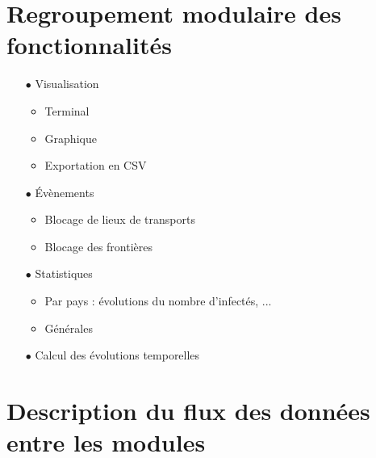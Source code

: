 \documentclass[12pt,a4paper]{report}
\begin{document}
\section*{Regroupement modulaire des fonctionnalités}
\begin{flushleft}
	\begin{itemize}
		\item[$\bullet$] Visualisation
			\begin{itemize}
				\item Terminal
				\item Graphique
				\item Exportation en CSV
			\end{itemize}
		\item[$\bullet$] Évènements
			\begin{itemize}
				\item Blocage de lieux de transports
				\item Blocage des frontières
			\end{itemize}
		\item[$\bullet$] Statistiques
			\begin{itemize}
				\item Par pays : évolutions du nombre d'infectés, ...
				\item Générales
			\end{itemize}
		\item[$\bullet$] Calcul des évolutions temporelles
	\end{itemize}
\end{flushleft}

\section*{Description du flux des données entre les modules}
\end{document}
